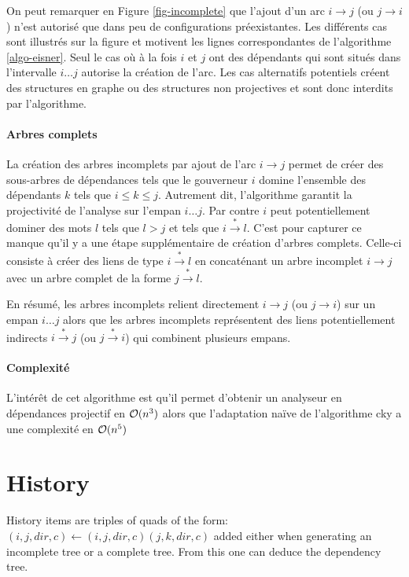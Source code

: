 \documentclass[11pt,openany]{book}
\begin{document}
On peut remarquer en Figure \ref{fig-incomplete} que 
l'ajout d'un arc  $i \rightarrow j$ (ou $j \rightarrow i$)
n'est autorisé que dans peu de configurations préexistantes. Les différents cas sont
illustrés sur la figure et motivent les lignes correspondantes de
l'algorithme \ref{algo-eisner}. Seul le cas où à la fois $i$ et $j$
ont des dépendants qui sont situés dans l'intervalle $i\ldots j$ autorise
la création de l'arc. Les cas alternatifs potentiels créent des
structures en graphe ou des structures non projectives et sont donc interdits par
l'algorithme.

\paragraph{Arbres complets}
La création des arbres incomplets par ajout de l'arc $i\rightarrow j$ permet de créer des sous-arbres de
dépendances tels que le gouverneur $i$ domine l'ensemble des
dépendants $k$ tels que $i\leq k \leq j$. Autrement dit, l'algorithme
garantit la projectivité de l'analyse sur l'empan $i\ldots j$. Par
contre $i$ peut potentiellement dominer des mots $l$ tels que $l > j$
et tels que $i\stackrel{*}{\rightarrow} l$. C'est pour capturer ce
manque qu'il y a une étape supplémentaire de création d'arbres complets. 
Celle-ci consiste à créer des liens de type
$i\stackrel{*}{\rightarrow} l$ en concaténant un arbre incomplet
$i\rightarrow j$ avec un arbre complet de la forme $j\stackrel{*}{\rightarrow} l$.

En résumé, les arbres incomplets relient directement $i\rightarrow j$
(ou $j\rightarrow i$)
sur un empan $i\ldots j$ alors que les arbres incomplets représentent
des liens potentiellement indirects $i\stackrel{*}{\rightarrow} j$ (ou
 $j\stackrel{*}{\rightarrow} i$) qui combinent plusieurs empans.

\paragraph{Complexité}L'intérêt de cet algorithme est qu'il permet d'obtenir un analyseur en
dépendances projectif en ${\cal O}(n^3)$ alors que l'adaptation naïve
de l'algorithme {\sc cky} a une complexité en ${\cal O}(n^5)$

\section{History}
History items are triples of quads of the form: $(i,j,dir,c) \leftarrow  (i,j,dir,c) (j,k,dir,c)$ added either when generating an incomplete tree or a complete tree. From this one can deduce the dependency tree.
\end{document}
